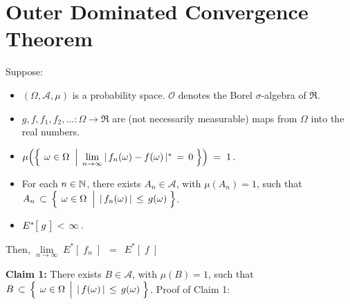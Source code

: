 

\section{Outer Dominated Convergence Theorem}
\setcounter{theorem}{0}
\setcounter{equation}{0}


\renewcommand{\theenumi}{\roman{enumi}}
\renewcommand{\labelenumi}{\textnormal{(\theenumi)}$\;\;$}


\begin{theorem}
\mbox{}\vskip 0.1cm
\noindent
Suppose:
\begin{itemize}
\item
	$(\Omega,\mathcal{A},\mu)$ is a probability space.
	$\mathcal{O}$ denotes the Borel $\sigma$-algebra of $\overline{\Re}$.
\item
	$g, f, f_{1}, f_{2}, \ldots : \Omega \longrightarrow \Re$ are (not necessarily measurable)
	maps from $\Omega$ into the real numbers.
\item
	$\mu\!\left(\left\{\;
		\left.
		\omega \overset{{\color{white}.}}{\in} \Omega
		\;\;\right\vert\;
		\underset{n\rightarrow\infty}{\lim}\,\vert\, f_{n}(\omega) - f(\omega) \,\vert^{*} \,=\, 0
	\;\right\}\right)
	\; = \; 1\,.$
\item
	For each $n \in \mathbb{N}$, there exists $A_{n} \in \mathcal{A}$, with $\mu(A_{n}) = 1$, such that\;
	$A_{n}
	\,\subset\,
		\left\{\;
			\left.
			\omega \overset{{\color{white}.}}{\in} \Omega
			\;\;\right\vert\;
			\vert\,f_{n}(\omega)\,\vert \,\leq\, g(\omega)
		\;\right\}$.
\item
	$E^{*}\!\left[\;\overset{{\color{white}.}}{g}\;\right] \,<\, \infty$\,.
\end{itemize}
Then, $\underset{n\rightarrow\infty}{\lim}\;E^{*}\!\left[\;f_{n}\;\right]$ \,$=$\, $E^{*}\!\left[\;f\;\right]$
\end{theorem}
\proof
\vskip 0.3cm
\noindent
\textbf{Claim 1:}\quad
There exists $B \in \mathcal{A}$, with $\mu(B)=1$, such that\,
$B \,\subset\, \left\{\;\left.\omega\overset{{\color{white}.}}{\in}\Omega\,\;\right\vert\;\vert\,f(\omega)\,\vert\,\leq\,g(\omega)\;\right\}$.
\vskip 0.1cm
\noindent
Proof of Claim 1:\;\;
